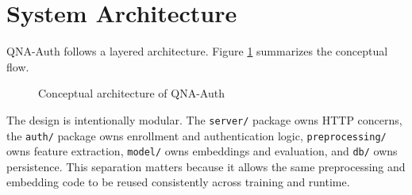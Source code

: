 \documentclass[12pt]{report}
\begin{document}
\section{System Architecture}
QNA-Auth follows a layered architecture. Figure \ref{fig:architecture} summarizes the conceptual flow.

\begin{figure}[H]
\centering
{}
\caption{Conceptual architecture of QNA-Auth}
\label{fig:architecture}
\end{figure}

The design is intentionally modular. The \texttt{server/} package owns HTTP concerns, the \texttt{auth/} package owns enrollment and authentication logic, \texttt{preprocessing/} owns feature extraction, \texttt{model/} owns embeddings and evaluation, and \texttt{db/} owns persistence. This separation matters because it allows the same preprocessing and embedding code to be reused consistently across training and runtime.
\end{document}
